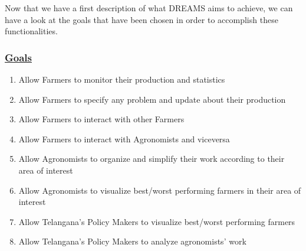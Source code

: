 	Now that we have a first description of what DREAMS aims to achieve, we can have a look at the goals that have been chosen in order to accomplish these functionalities.
	
	\newpage
	
	\subsubsection[Goals]{\hyperlink{toc}{Goals}}
		\label{sec:goals}
		\begin{enumerate}[label=\textbf{G\arabic*}]
			\item \label{goal:G1} Allow Farmers to monitor their production and statistics
			\item \label{goal:G2} Allow Farmers to specify any problem and update about their production
			\item \label{goal:G3} Allow Farmers to interact with other Farmers
			\item \label{goal:G4} Allow Farmers to interact with Agronomists and viceversa
			\item \label{goal:G5} Allow Agronomists to organize and simplify their work according to their area of interest	
			\item \label{goal:G6} Allow Agronomists to visualize best/worst performing farmers in their area of interest
			\item \label{goal:G7} Allow Telangana's Policy Makers to visualize best/worst performing farmers
			\item \label{goal:G8} Allow Telangana's Policy Makers to analyze agronomists' work
		\end{enumerate}
	
	\vspace{1cm}
	
